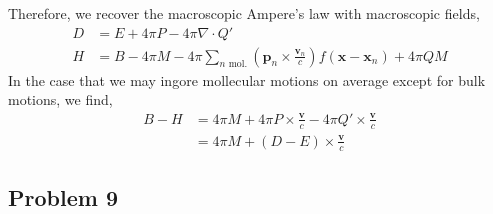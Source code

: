 \documentclass[12pt]{extarticle}
\renewcommand{\bf}[1]{\mathbf{#1}}
\theoremstyle{definition}
\begin{document}
Therefore, we recover the macroscopic Ampere's law with macroscopic fields, 
\begin{align*}
D & = E + 4 \pi P - 4 \pi \nabla \cdot Q'
\\
H & = B - 4 \pi M - 4 \pi \sum_{n \text{ mol.}} \left( \bf{p}_n \times \frac{\bf{v}_n}{c} \right) f(\bf{x} - \bf{x}_n) + 4 \pi QM
\end{align*}
In the case that we may ingore mollecular motions on average except for bulk motions, we find,
\begin{align*}
B - H & = 4 \pi M + 4 \pi P \times \frac{\bf{v}}{c} - 4 \pi Q' \times \frac{\bf{v}}{c} 
\\
& = 4 \pi M + (D - E) \times \frac{\bf{v}}{c} 
\end{align*}


\subsection{Problem 9}
\end{document}
